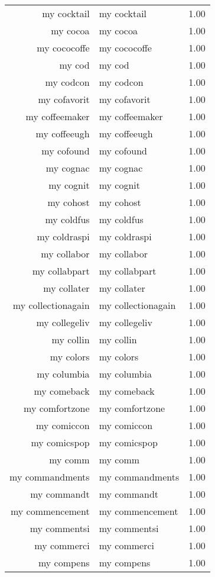 \begin{table}[ht]
\begin{tabular}{rlr}
  my cocktail & my cocktail & 1.00 \\ 
  my cocoa & my cocoa & 1.00 \\ 
  my cococoffe & my cococoffe & 1.00 \\ 
  my cod & my cod & 1.00 \\ 
  my codcon & my codcon & 1.00 \\ 
  my cofavorit & my cofavorit & 1.00 \\ 
  my coffeemaker & my coffeemaker & 1.00 \\ 
  my coffeeugh & my coffeeugh & 1.00 \\ 
  my cofound & my cofound & 1.00 \\ 
  my cognac & my cognac & 1.00 \\ 
  my cognit & my cognit & 1.00 \\ 
  my cohost & my cohost & 1.00 \\ 
  my coldfus & my coldfus & 1.00 \\ 
  my coldraspi & my coldraspi & 1.00 \\ 
  my collabor & my collabor & 1.00 \\ 
  my collabpart & my collabpart & 1.00 \\ 
  my collater & my collater & 1.00 \\ 
  my collectionagain & my collectionagain & 1.00 \\ 
  my collegeliv & my collegeliv & 1.00 \\ 
  my collin & my collin & 1.00 \\ 
  my colors & my colors & 1.00 \\ 
  my columbia & my columbia & 1.00 \\ 
  my comeback & my comeback & 1.00 \\ 
  my comfortzone & my comfortzone & 1.00 \\ 
  my comiccon & my comiccon & 1.00 \\ 
  my comicspop & my comicspop & 1.00 \\ 
  my comm & my comm & 1.00 \\ 
  my commandments & my commandments & 1.00 \\ 
  my commandt & my commandt & 1.00 \\ 
  my commencement & my commencement & 1.00 \\ 
  my commentsi & my commentsi & 1.00 \\ 
  my commerci & my commerci & 1.00 \\ 
  my compens & my compens & 1.00 \\ 

\end{tabular}
\end{table}
